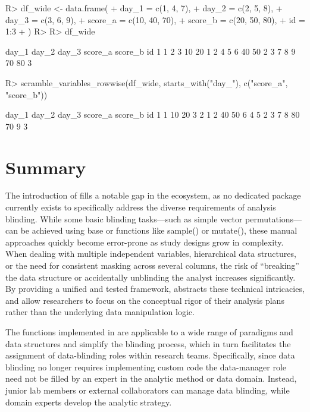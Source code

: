 \documentclass[
]{jss}
\begin{document}
\begin{CodeChunk}
\begin{CodeInput}
R> df_wide <- data.frame(
+   day_1 = c(1, 4, 7),
+   day_2 = c(2, 5, 8),
+   day_3 = c(3, 6, 9),
+   score_a = c(10, 40, 70),
+   score_b = c(20, 50, 80),
+   id = 1:3
+ )
R> 
R> df_wide
\end{CodeInput}
\begin{CodeOutput}
  day_1 day_2 day_3 score_a score_b id
1     1     2     3      10      20  1
2     4     5     6      40      50  2
3     7     8     9      70      80  3
\end{CodeOutput}
\begin{CodeInput}
R> scramble_variables_rowwise(df_wide, starts_with("day_"), c("score_a", "score_b"))
\end{CodeInput}
\begin{CodeOutput}
  day_1 day_2 day_3 score_a score_b id
1     1    10    20       3       2  1
2    40    50     6       4       5  2
3     7     8    80      70       9  3
\end{CodeOutput}
\end{CodeChunk}

\section{Summary}\label{summary}

The introduction of  fills a notable gap in the 
ecosystem, as no dedicated package currently exists to specifically
address the diverse requirements of analysis blinding. While some basic
blinding tasks---such as simple vector permutations---can be achieved
using base  or  functions like sample() or
mutate(), these manual approaches quickly become error-prone as study
designs grow in complexity. When dealing with multiple independent
variables, hierarchical data structures, or the need for consistent
masking across several columns, the risk of ``breaking'' the data
structure or accidentally unblinding the analyst increases
significantly. By providing a unified and tested framework, 
abstracts these technical intricacies, and allow researchers to focus on
the conceptual rigor of their analysis plans rather than the underlying
data manipulation logic.

The functions implemented in  are applicable to a wide range
of paradigms and data structures and simplify the blinding process,
which in turn facilitates the assignment of data-blinding roles within
research teams. Specifically, since data blinding no longer requires
implementing custom code the data-manager role need not be filled by an
expert in the analytic method or data domain. Instead, junior lab
members or external collaborators can manage data blinding, while domain
experts develop the analytic strategy.
\end{document}

